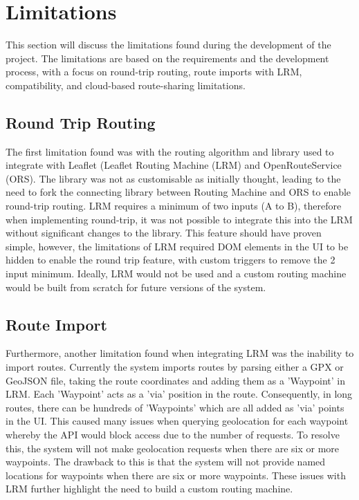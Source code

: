 \clearpage
\section{Limitations}
\label{evaluation:limitations}

This section will discuss the limitations found during the development of the project. The limitations are based on the requirements and the development process, with a focus on round-trip routing, route imports with LRM, compatibility, and cloud-based route-sharing limitations.

\subsection{Round Trip Routing}
The first limitation found was with the routing algorithm and library used to integrate with Leaflet (Leaflet Routing Machine (LRM) and OpenRouteService (ORS). The library was not as customisable as initially thought, leading to the need to fork the connecting library between Routing Machine and ORS to enable round-trip routing. LRM requires a minimum of two inputs (A to B), therefore when implementing round-trip, it was not possible to integrate this into the LRM without significant changes to the library. This feature should have proven simple, however, the limitations of LRM required DOM elements in the UI to be hidden to enable the round trip feature, with custom triggers to remove the 2 input minimum. Ideally, LRM would not be used and a custom routing machine would be built from scratch for future versions of the system.

\subsection{Route Import}
Furthermore, another limitation found when integrating LRM was the inability to import routes. Currently the system imports routes by parsing either a GPX or GeoJSON file, taking the route coordinates and adding them as a 'Waypoint' in LRM. Each 'Waypoint' acts as a 'via' position in the route. Consequently, in long routes, there can be hundreds of 'Waypoints' which are all added as 'via' points in the UI. This caused many issues when querying geolocation for each waypoint whereby the API would block access due to the number of requests. To resolve this, the system will not make geolocation requests when there are six or more waypoints. The drawback to this is that the system will not provide named locations for waypoints when there are six or more waypoints. These issues with LRM further highlight the need to build a custom routing machine.

